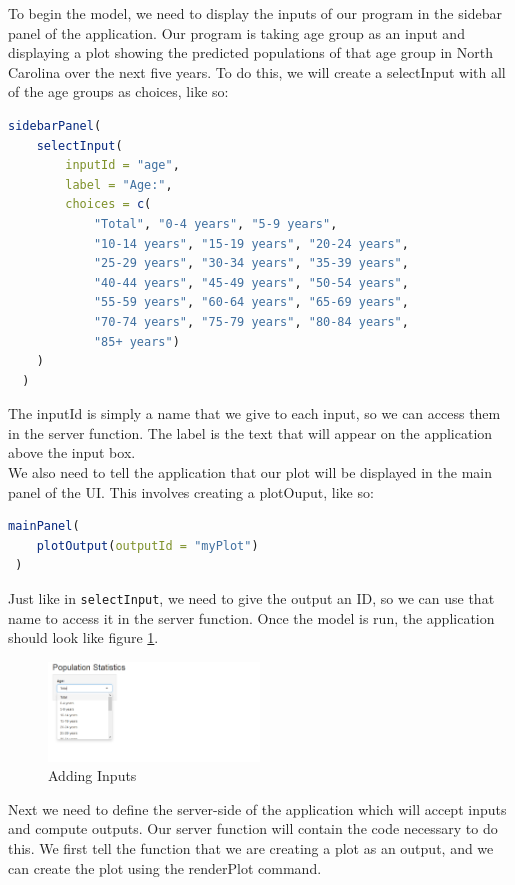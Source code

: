To begin the model, we need to display the inputs of our program in the sidebar panel of the application. Our program is taking age group as an input and displaying a plot showing the predicted populations of that age group in North Carolina over the next five years. To do this, we will create a selectInput with all of the age groups as choices, like so:
\begin{lstlisting}[language = R]
sidebarPanel(
    selectInput(
        inputId = "age", 
        label = "Age:", 
        choices = c(
            "Total", "0-4 years", "5-9 years", 
            "10-14 years", "15-19 years", "20-24 years", 
            "25-29 years", "30-34 years", "35-39 years", 
            "40-44 years", "45-49 years", "50-54 years", 
            "55-59 years", "60-64 years", "65-69 years", 
            "70-74 years", "75-79 years", "80-84 years", 
            "85+ years")
    )
  )
\end{lstlisting}
The inputId is simply a name that we give to each input, so we can access them in the server function. The label is the text that will appear on the application above the input box. \\
We also need to tell the application that our plot will be displayed in the main panel of the UI. This involves creating a plotOuput, like so: 
\begin{lstlisting}[language = R]
 mainPanel(
    plotOutput(outputId = "myPlot")
 )
\end{lstlisting}
Just like in \texttt{selectInput}, we need to give the output an ID, so we can use that name to access it in the server function.
Once the model is run, the application should look like figure \ref{fig:drop}. 
\begin{figure}[h]
   \centering
   \includegraphics[width=0.5\textwidth]{pictures/shiny/dropdown.PNG} 
   \caption{Adding Inputs}
   \label{fig:drop}
\end{figure}
Next we need to define the server-side of the application which will accept inputs and compute outputs.
Our server function will contain the code necessary to do this.
We first tell the function that we are creating a plot as an output, and we can create the plot using the renderPlot command.
